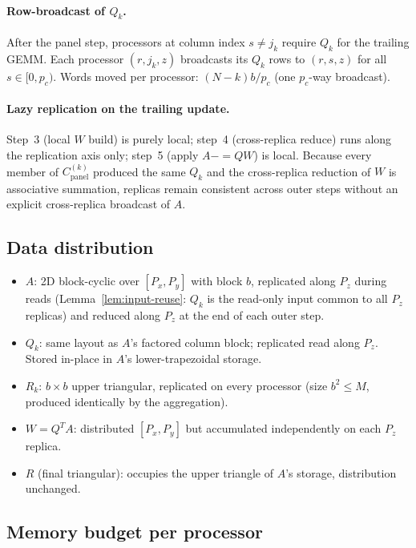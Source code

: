 \documentclass[11pt]{article}
\begin{document}
\paragraph{Row-broadcast of $Q_k$.}
After the panel step, processors at column index $s \neq j_k$ require
$Q_k$ for the trailing GEMM. Each processor $(r,j_k,z)$ broadcasts its
$Q_k$ rows to $(r,s,z)$ for all $s \in [0, p_c)$. Words moved per
processor: $(N-k)b/p_c$ (one $p_c$-way broadcast).

\paragraph{Lazy replication on the trailing update.}
Step~3 (local $W$ build) is purely local; step~4 (cross-replica reduce)
runs along the replication axis only; step~5 (apply $A {-}{=} QW$) is
local. Because every member of $C^{(k)}_{\mathrm{panel}}$ produced the
same $Q_k$ and the cross-replica reduction of $W$ is associative
summation, replicas remain consistent across outer steps without an
explicit cross-replica broadcast of $A$.

\subsection{Data distribution}
\label{sec:A3b0}
\begin{itemize}[leftmargin=2em]
  \item $A$: 2D block-cyclic over $[P_x, P_y]$ with block $b$,
    replicated along $P_z$ during reads
    (Lemma~\ref{lem:input-reuse}: $Q_k$ is the read-only input common
    to all $P_z$ replicas) and reduced along $P_z$ at the end of each
    outer step.
  \item $Q_k$: same layout as $A$'s factored column block; replicated
    read along $P_z$. Stored in-place in $A$'s lower-trapezoidal storage.
  \item $R_k$: $b\times b$ upper triangular, replicated on every
    processor (size $b^2 \le M$, produced identically by the
    aggregation).
  \item $W = Q^T A$: distributed $[P_x,P_y]$ but accumulated
    independently on each $P_z$ replica.
  \item $R$ (final triangular): occupies the upper triangle of $A$'s
    storage, distribution unchanged.
\end{itemize}

\subsection{Memory budget per processor}
\label{sec:A3b}
\end{document}
